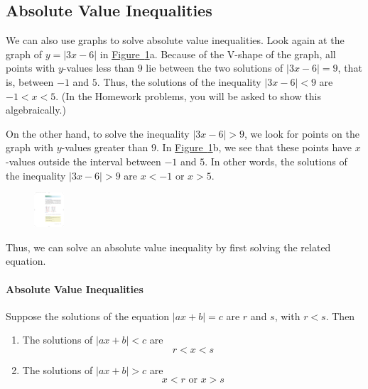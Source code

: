\documentclass[10pt,]{book}
\theoremstyle{plain}
\theoremstyle{definition}
\theoremstyle{definition}
\theoremstyle{definition}
\theoremstyle{definition}
\theoremstyle{definition}
\numberwithin{equation}{section}
\newcommand\abs[1]{\left|#1\right|}
\newcommand{\lt}{ < }
\newcommand{\gt}{ > }
\begin{document}
\subsection[Absolute Value Inequalities]{Absolute Value Inequalities}\label{subsection-49}

    We can also use graphs to solve absolute value inequalities. Look again at the graph of \(y = \abs{3x − 6}\) in \hyperref[fig-abs-inequality]{Figure~\ref{fig-abs-inequality}}a. Because of the V-shape of the graph, all points with \(y\)-values less than \(9\) lie between the two solutions of \(\abs{3x − 6} = 9\), that is, between \(−1\) and \(5\). Thus, the solutions of the inequality \(\abs{3x − 6} \lt 9\) are \(−1 \lt x \lt 5\). (In the Homework problems, you will be asked to show this algebraically.) 
%
\par

    On the other hand, to solve the inequality \(\abs{3x − 6} \gt 9\), we look for points on the graph with \(y\)-values greater than \(9\). In \hyperref[fig-abs-inequality]{Figure~\ref{fig-abs-inequality}}b, we see that these points have \(x\)-values outside the interval between \(−1\) and \(5\). In other words, the solutions of the inequality \(\abs{3x − 6} \gt 9\) are \(x \lt −1\) or \(x \gt 5\).
%
\leavevmode%
\begin{figure}
\centering
\includegraphics[width=0.100\textwidth,]{images/fig-abs-inequality.pdf}\caption{\label{fig-abs-inequality}}
\end{figure}
\par

    Thus, we can solve an absolute value inequality by first solving the related equation.
%
\typeout{************************************************}
\typeout{************************************************}
\paragraph[Absolute Value Inequalities]{Absolute Value Inequalities}\label{paragraphs-32}
%
\par

    Suppose the solutions of the equation \(\abs{ax+b}=c\) are \(r\) and \(s\), with \(r \lt s\). Then
    \leavevmode%
\begin{enumerate}
\item\hypertarget{li-357}{}The solutions of \(\abs{ax+b} \lt c\) are 
        \begin{equation*}r \lt  x \lt  s\end{equation*}\item\hypertarget{li-358}{}The solutions of \(\abs{ax+b} \gt c\) are
        \begin{equation*}x \lt  r \text{ or } x \gt  s\end{equation*}\end{enumerate}
\end{document}
